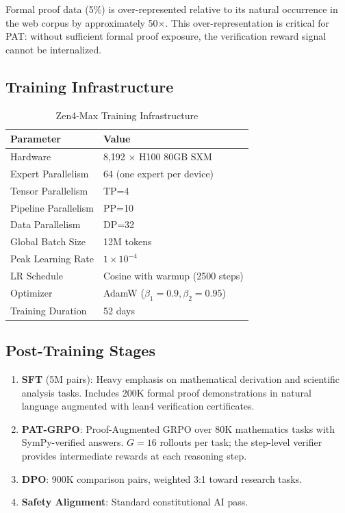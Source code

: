 \documentclass[11pt,a4paper]{article}
\begin{document}
Formal proof data (5\%) is over-represented relative to its natural occurrence in the web
corpus by approximately 50$\times$. This over-representation is critical for PAT: without
sufficient formal proof exposure, the verification reward signal cannot be internalized.

\subsection{Training Infrastructure}

\begin{table}[H]
\centering
\begin{tabular}{ll}
\toprule
\textbf{Parameter} & \textbf{Value} \\
\midrule
Hardware               & 8,192 $\times$ H100 80GB SXM \\
Expert Parallelism     & 64 (one expert per device) \\
Tensor Parallelism     & TP=4 \\
Pipeline Parallelism   & PP=10 \\
Data Parallelism       & DP=32 \\
Global Batch Size      & 12M tokens \\
Peak Learning Rate     & $1 \times 10^{-4}$ \\
LR Schedule            & Cosine with warmup (2500 steps) \\
Optimizer              & AdamW ($\beta_1=0.9, \beta_2=0.95$) \\
Training Duration      & 52 days \\
\bottomrule
\end{tabular}
\caption{Zen4-Max Training Infrastructure}
\end{table}

\subsection{Post-Training Stages}

\begin{enumerate}
    \item \textbf{SFT} (5M pairs): Heavy emphasis on mathematical derivation and
    scientific analysis tasks. Includes 200K formal proof demonstrations in natural
    language augmented with lean4 verification certificates.
    \item \textbf{PAT-GRPO}: Proof-Augmented GRPO over 80K mathematics tasks with
    SymPy-verified answers. $G=16$ rollouts per task; the step-level verifier provides
    intermediate rewards at each reasoning step.
    \item \textbf{DPO}: 900K comparison pairs, weighted 3:1 toward research tasks.
    \item \textbf{Safety Alignment}: Standard constitutional AI pass.
\end{enumerate}
\end{document}
